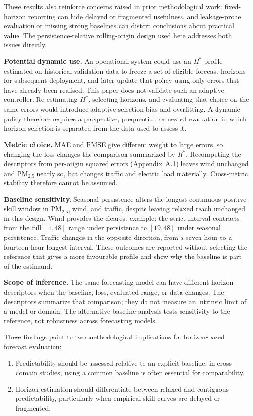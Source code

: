 \documentclass[pdflatex]{sn-jnl}
\begin{document}
These results also reinforce concerns raised in prior methodological work: fixed-horizon reporting can hide delayed or fragmented usefulness, and leakage-prone evaluation or missing strong baselines can distort conclusions about practical value. The persistence-relative rolling-origin design used here addresses both issues directly.

\textbf{Potential dynamic use.} An operational system could use an $H^*$
profile estimated on historical validation data to freeze a set of eligible
forecast horizons for subsequent deployment, and later update that policy
using only errors that have already been realised. This paper does not
validate such an adaptive controller. Re-estimating $H^*$, selecting horizons,
and evaluating that choice on the same errors would introduce adaptive
selection bias and overfitting. A dynamic policy therefore requires a
prospective, prequential, or nested evaluation in which horizon selection is
separated from the data used to assess it.

\textbf{Metric choice.} MAE and RMSE give different weight to large errors,
so changing the loss changes the comparison summarized by $H^*$. Recomputing
the descriptors from per-origin squared errors (Appendix~A.1) leaves wind
unchanged and PM$_{2.5}$ nearly so, but changes traffic and electric load
materially. Cross-metric stability therefore cannot be assumed.

\textbf{Baseline sensitivity.} Seasonal persistence alters the longest
continuous positive-skill window in PM$_{2.5}$, wind, and traffic, despite
leaving relaxed reach unchanged in this design. Wind provides the clearest
example: the strict interval contracts from the full $[1,48]$ range under
persistence to $[19,48]$ under seasonal persistence. Traffic changes in the
opposite direction, from a seven-hour to a fourteen-hour longest interval.
These outcomes are reported without selecting the reference that gives a more
favourable profile and show why the baseline is part of the estimand.

\textbf{Scope of inference.} The same forecasting model can have different
horizon descriptors when the baseline, loss, evaluated range, or data
changes. The descriptors summarize that comparison; they do not measure
an intrinsic limit of a model or domain. The alternative-baseline analysis
tests sensitivity to the reference, not robustness across forecasting models.

These findings point to two methodological implications for horizon-based forecast evaluation:
\begin{enumerate}
  \item Predictability should be assessed relative to an explicit baseline; in cross-domain studies, using a common baseline is often essential for comparability.
  \item Horizon estimation should differentiate between relaxed and contiguous predictability, particularly when empirical skill curves are delayed or fragmented.
\end{enumerate}
\end{document}
